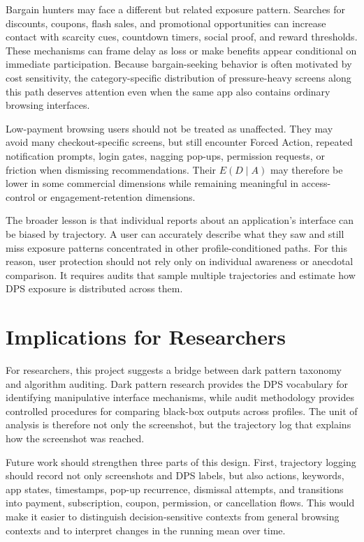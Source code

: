 Bargain hunters may face a different but related exposure pattern. Searches for discounts, coupons, flash sales, and promotional opportunities can increase contact with scarcity cues, countdown timers, social proof, and reward thresholds. These mechanisms can frame delay as loss or make benefits appear conditional on immediate participation. Because bargain-seeking behavior is often motivated by cost sensitivity, the category-specific distribution of pressure-heavy screens along this path deserves attention even when the same app also contains ordinary browsing interfaces.

Low-payment browsing users should not be treated as unaffected. They may avoid many checkout-specific screens, but still encounter Forced Action, repeated notification prompts, login gates, nagging pop-ups, permission requests, or friction when dismissing recommendations. Their \(E(D \mid A)\) may therefore be lower in some commercial dimensions while remaining meaningful in access-control or engagement-retention dimensions.

The broader lesson is that individual reports about an application's interface can be biased by trajectory. A user can accurately describe what they saw and still miss exposure patterns concentrated in other profile-conditioned paths. For this reason, user protection should not rely only on individual awareness or anecdotal comparison. It requires audits that sample multiple trajectories and estimate how DPS exposure is distributed across them.

\section{Implications for Researchers}

For researchers, this project suggests a bridge between dark pattern taxonomy and algorithm auditing. Dark pattern research provides the DPS vocabulary for identifying manipulative interface mechanisms, while audit methodology provides controlled procedures for comparing black-box outputs across profiles. The unit of analysis is therefore not only the screenshot, but the trajectory log that explains how the screenshot was reached.

Future work should strengthen three parts of this design. First, trajectory logging should record not only screenshots and DPS labels, but also actions, keywords, app states, timestamps, pop-up recurrence, dismissal attempts, and transitions into payment, subscription, coupon, permission, or cancellation flows. This would make it easier to distinguish decision-sensitive contexts from general browsing contexts and to interpret changes in the running mean over time.

